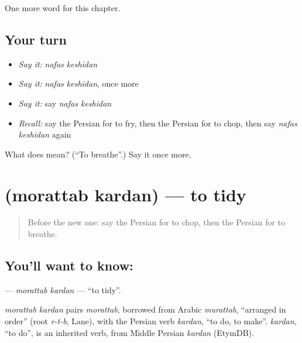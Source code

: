 \begin{grammarlens}[title={What you've built}]
One more word for this chapter.
\end{grammarlens}

\subsection*{Your turn}
\begin{itemize}
\raggedright
  \item \emph{Say it:} \emph{nafas keshidan}
  \item \emph{Say it:} \emph{nafas keshidan}, once more
  \item \emph{Say it:} say \emph{nafas keshidan}
  \item \emph{Recall:} say the Persian for to fry, then the Persian for to chop, then say \emph{nafas keshidan} again
\end{itemize}

\begin{tcolorbox}[breakable,colback=teal!4,colframe=teal!35!black,title={Before you move on}]
What does   mean? (\textquotedblleft{}To breathe\textquotedblright{}.) Say it once more.
\end{tcolorbox}
\section[\texorpdfstring{\fa{مرتب} \fa{کردن} (morattab kardan)}{مرتب کردن (morattab kardan)}]{  (morattab kardan) — to tidy}

\label{lesson:FA-C181-morattab-kardan}



\begin{quote}
Before the new one: say the Persian for to chop, then the Persian for to breathe.
\end{quote}

\subsection*{You'll want to know:  }
\textbf{ } — \emph{morattab kardan} — \textquotedblleft{}to tidy\textquotedblright{}.

\begin{cousinweb}
\emph{morattab kardan} pairs \emph{morattab}, borrowed from Arabic \emph{murattab}, \textquotedblleft{}arranged in order\textquotedblright{} (root \emph{r-t-b}, Lane), with the Persian verb \emph{kardan}, \textquotedblleft{}to do, to make\textquotedblright{}. \emph{kardan}, \textquotedblleft{}to do\textquotedblright{}, is an inherited verb, from Middle Persian \emph{kardan} (EtymDB).
\end{cousinweb}

